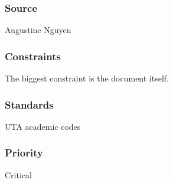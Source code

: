 \subsubsection{Source}
Augustine Nguyen
\subsubsection{Constraints}
The biggest constraint is the document itself.
\subsubsection{Standards}
UTA academic codes
\subsubsection{Priority}
Critical